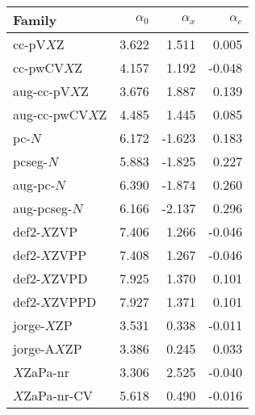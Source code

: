 \begin{tabular}{l|r|r|r}
\textbf{Family} & $\alpha_0$ & $\alpha_x$ & $\alpha_c$ \\
\hline
cc-pV$X$Z       & 3.622 &  1.511 &  0.005 \\
cc-pwCV$X$Z     & 4.157 &  1.192 & -0.048 \\
aug-cc-pV$X$Z   & 3.676 &  1.887 &  0.139 \\
aug-cc-pwCV$X$Z & 4.485 &  1.445 &  0.085 \\
pc-$N$          & 6.172 & -1.623 &  0.183 \\
pcseg-$N$       & 5.883 & -1.825 &  0.227 \\
aug-pc-$N$      & 6.390 & -1.874 &  0.260 \\
aug-pcseg-$N$   & 6.166 & -2.137 &  0.296 \\
def2-$X$ZVP     & 7.406 &  1.266 & -0.046 \\
def2-$X$ZVPP    & 7.408 &  1.267 & -0.046 \\
def2-$X$ZVPD    & 7.925 &  1.370 &  0.101 \\
def2-$X$ZVPPD   & 7.927 &  1.371 &  0.101 \\
jorge-$X$ZP     & 3.531 &  0.338 & -0.011 \\
jorge-A$X$ZP    & 3.386 &  0.245 &  0.033 \\
$X$ZaPa-nr      & 3.306 &  2.525 & -0.040 \\
$X$ZaPa-nr-CV   & 5.618 &  0.490 & -0.016 \\
\hline
\end{tabular}